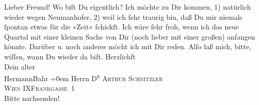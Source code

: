 \begin{ledgroupsized}[t]{13cm}
           \pstart\center{}Lieber Freund!\pend\pstart
           Wo biſt Du eigentlich? Ich möchte zu Dir kommen, 1) natürlich wieder wegen Neumanhofer, 2) weil ich ſehr traurig bin, daß
               Du mir niemals ſpontan etwas für die »Zeit«
               ſchickſt. Ich wäre ſehr froh, wenn ich das neue Quartal {\pb}mit einer kleinen Sache von Dir (noch lieber mit
               einer großen) anfangen  könnte. Darüber u. noch anderes
               möcht ich mit Dir reden. Alſo laß mich, bitte, wiſſen, wann Du wieder da biſt.\pend
           \pstart
           Herzlichſt{\\[\baselineskip]}Dein alter{\\[\baselineskip]}\spacefill\mbox{HermannBahr}\pend
           \leftskip=0em{}\pstart
           \noindent{}Herrn \textsc{D\textsuperscript{r} Arthur Schnitzler}{\\}\textsc{Wien IXFrankgasse 1}{\\}Bitte nachsenden!\pend
           \pstart
           \textcolor{gray}{\textbf{\label{T_L00843-1v}\label{T_L00843-1h}}}\pend
           
         
         \endnumbering{}\end{ledgroupsized}  \newcommand{\dateiname}{L00843}\newcommand{\titel}{Hermann Bahr an Arthur Schnitzler, 2. 9. 1898}\newcommand{\editorInnen}{ Kurt Ifkovits,  Martin Anton Müller}
      